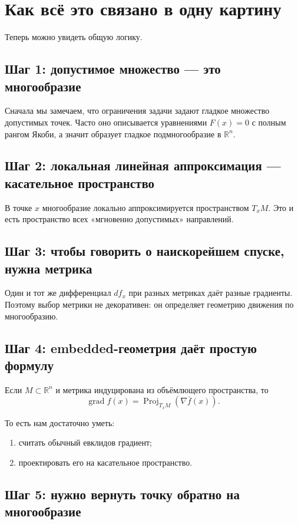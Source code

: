 \documentclass[12pt,a4paper]{article}
\theoremstyle{rudef}
\theoremstyle{ruplain}
\newcommand{\R}{\mathbb{R}}
\newcommand{\grad}{\operatorname{grad}}
\newcommand{\Proj}{\operatorname{Proj}}
\begin{document}
\section{Как всё это связано в одну картину}

Теперь можно увидеть общую логику.

\subsection{Шаг 1: допустимое множество --- это многообразие}

Сначала мы замечаем, что ограничения задачи задают гладкое множество допустимых точек. Часто оно описывается уравнениями $F(x)=0$ с полным рангом Якоби, а значит образует гладкое подмногообразие в $\R^n$.

\subsection{Шаг 2: локальная линейная аппроксимация --- касательное пространство}

В точке $x$ многообразие локально аппроксимируется пространством $T_xM$. Это и есть пространство всех «мгновенно допустимых» направлений.

\subsection{Шаг 3: чтобы говорить о наискорейшем спуске, нужна метрика}

Один и тот же дифференциал $df_x$ при разных метриках даёт разные градиенты. Поэтому выбор метрики не декоративен: он определяет геометрию движения по многообразию.

\subsection{Шаг 4: embedded-геометрия даёт простую формулу}

Если $M\subset \R^n$ и метрика индуцирована из объёмлющего пространства, то
\[
\grad f(x)=\Proj_{T_xM}(\nabla \bar f(x)).
\]

То есть нам достаточно уметь:
\begin{enumerate}
  \item считать обычный евклидов градиент;
  \item проектировать его на касательное пространство.
\end{enumerate}

\subsection{Шаг 5: нужно вернуть точку обратно на многообразие}
\end{document}
